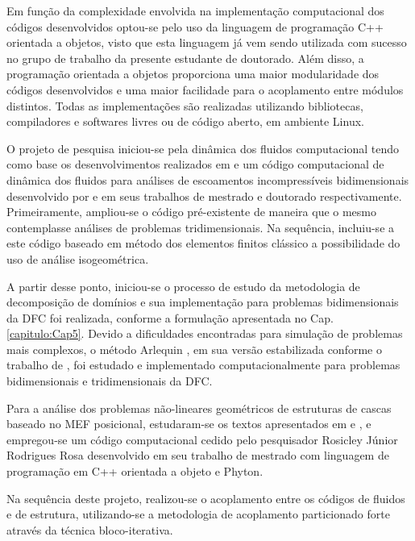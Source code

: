 \documentclass[tese_patricia.tex]{subfiles}
\begin{document}
Em função da complexidade envolvida na implementação computacional dos códigos desenvolvidos optou-se pelo uso da linguagem de programação C++ orientada a objetos, visto que esta linguagem já vem sendo utilizada com sucesso no grupo de trabalho da presente estudante de doutorado. Além disso, a programação orientada a objetos proporciona uma maior modularidade dos códigos desenvolvidos e uma maior facilidade para o acoplamento entre módulos distintos.  Todas as implementações são realizadas utilizando bibliotecas, compiladores e softwares livres ou de código aberto, em ambiente Linux.

O projeto de pesquisa iniciou-se pela dinâmica dos fluidos computacional tendo como base os desenvolvimentos realizados em  e 
um código computacional de dinâmica dos fluidos para análises de escoamentos incompressíveis bidimensionais desenvolvido por  e  em seus trabalhos de mestrado e doutorado respectivamente. Primeiramente, ampliou-se o código pré-existente de maneira que o mesmo contemplasse análises de problemas tridimensionais. Na sequência, incluiu-se a este código baseado em método dos elementos finitos clássico a possibilidade do uso de análise isogeométrica.

A partir desse ponto, iniciou-se o processo de estudo da metodologia de decomposição de domínios e sua implementação para problemas bidimensionais da DFC foi realizada, conforme a formulação apresentada no Cap. \ref{capitulo:Cap5}. Devido a dificuldades encontradas para simulação de problemas mais complexos, o método Arlequin \cite{Dhia:1998}, em sua versão estabilizada conforme o trabalho de , foi estudado e implementado computacionalmente para problemas bidimensionais e tridimensionais da DFC.

Para a análise dos problemas não-lineares geométricos de estruturas de cascas baseado no MEF posicional, estudaram-se os textos apresentados em  e , e empregou-se um código computacional cedido pelo pesquisador Rosicley Júnior Rodrigues Rosa desenvolvido em seu trabalho de mestrado  \cite{Rosa:2021} com linguagem de programação em C++ orientada a objeto e Phyton.

Na sequência deste projeto, realizou-se o acoplamento entre os códigos de fluidos e de estrutura, utilizando-se a metodologia de acoplamento particionado forte através da técnica bloco-iterativa.
\end{document}
